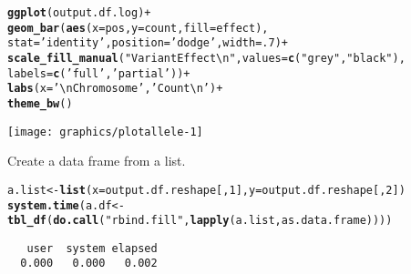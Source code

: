 \documentclass[9pt,english]{extarticle}\usepackage[]{graphicx}\usepackage[]{color}
\makeatletter
\newcommand{\hlnum}[1]{\textcolor[rgb]{0.686,0.059,0.569}{#1}}%
\newcommand{\hlstr}[1]{\textcolor[rgb]{0.192,0.494,0.8}{#1}}%
\newcommand{\hlopt}[1]{\textcolor[rgb]{0,0,0}{#1}}%
\newcommand{\hlstd}[1]{\textcolor[rgb]{0.345,0.345,0.345}{#1}}%
\newcommand{\hlkwb}[1]{\textcolor[rgb]{0.69,0.353,0.396}{#1}}%
\newcommand{\hlkwc}[1]{\textcolor[rgb]{0.333,0.667,0.333}{#1}}%
\newcommand{\hlkwd}[1]{\textcolor[rgb]{0.737,0.353,0.396}{\textbf{#1}}}%
\newenvironment{kframe}{%
 \def\at@end@of@kframe{}%
 \ifinner\ifhmode%
  \def\at@end@of@kframe{\end{minipage}}%
  \begin{minipage}{\columnwidth}%
 \fi\fi%
 \def\FrameCommand##1{\hskip\@totalleftmargin \hskip-\fboxsep
 \colorbox{shadecolor}{##1}\hskip-\fboxsep
     \hskip-\linewidth \hskip-\@totalleftmargin \hskip\columnwidth}%
 \MakeFramed {\advance\hsize-\width
   \@totalleftmargin\z@ \linewidth\hsize
   \@setminipage}}%
 {\par\unskip\endMakeFramed%
 \at@end@of@kframe}
\newenvironment{knitrout}{}{} %
\makeatother
\begin{document}
\begin{linenumbers}
\begin{knitrout}
\begin{kframe}
\begin{alltt}
\hlkwd{ggplot}\hlstd{(output.df.log)} \hlopt{+}
    \hlkwd{geom_bar}\hlstd{(}\hlkwd{aes}\hlstd{(}\hlkwc{x} \hlstd{= pos,} \hlkwc{y} \hlstd{= count,} \hlkwc{fill} \hlstd{= effect),}
             \hlkwc{stat} \hlstd{=} \hlstr{'identity'}\hlstd{,} \hlkwc{position} \hlstd{=} \hlstr{'dodge'}\hlstd{,} \hlkwc{width} \hlstd{=} \hlnum{.7}\hlstd{)} \hlopt{+}
    \hlkwd{scale_fill_manual}\hlstd{(}\hlstr{"Variant Effect\textbackslash{}n"}\hlstd{,} \hlkwc{values} \hlstd{=} \hlkwd{c}\hlstd{(}\hlstr{"grey"}\hlstd{,} \hlstr{"black"}\hlstd{),}
                      \hlkwc{labels} \hlstd{=} \hlkwd{c}\hlstd{(}\hlstr{'full'}\hlstd{,} \hlstr{'partial'}\hlstd{))} \hlopt{+}
    \hlkwd{labs}\hlstd{(}\hlkwc{x} \hlstd{=} \hlstr{'\textbackslash{}nChromosome'}\hlstd{,} \hlstr{'Count\textbackslash{}n'}\hlstd{)} \hlopt{+}
    \hlkwd{theme_bw}\hlstd{()}
\end{alltt}
\end{kframe}

{\centering \texttt{[image: graphics/plotallele-1]} 

}



\end{knitrout}

Create a data frame from a list.
\begin{knitrout}
\color{fgcolor}\begin{kframe}
\begin{alltt}
\hlstd{a.list} \hlkwb{<-} \hlkwd{list}\hlstd{(}\hlkwc{x}\hlstd{=output.df.reshape[,}\hlnum{1}\hlstd{],} \hlkwc{y}\hlstd{=output.df.reshape[,}\hlnum{2}\hlstd{])}
\hlkwd{system.time}\hlstd{(a.df} \hlkwb{<-} \hlkwd{tbl_df}\hlstd{(}\hlkwd{do.call}\hlstd{(}\hlstr{"rbind.fill"}\hlstd{,}\hlkwd{lapply}\hlstd{(a.list, as.data.frame))))}
\end{alltt}
\begin{verbatim}
   user  system elapsed 
  0.000   0.000   0.002 
\end{verbatim}
\end{kframe}
\end{knitrout}


\end{linenumbers}
\end{document}
